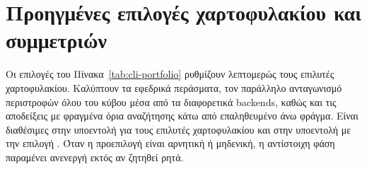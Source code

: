 \section{Προηγμένες επιλογές χαρτοφυλακίου και συμμετριών}
\label{sec:cli-portfolio}

Οι επιλογές του Πίνακα~\ref{tab:cli-portfolio} ρυθμίζουν λεπτομερώς τους επιλυτές χαρτοφυλακίου. Καλύπτουν τα εφεδρικά περάσματα, τον παράλληλο ανταγωνισμό περιστροφών όλου του κύβου μέσα από τα διαφορετικά backends, καθώς και τις αποδείξεις με φραγμένα όρια αναζήτησης κάτω από επαληθευμένο άνω φράγμα. Είναι διαθέσιμες στην υποεντολή  για τους επιλυτές χαρτοφυλακίου και στην υποεντολή  με την επιλογή . Όταν η προεπιλογή είναι αρνητική ή μηδενική, η αντίστοιχη φάση παραμένει ανενεργή εκτός αν ζητηθεί ρητά.

